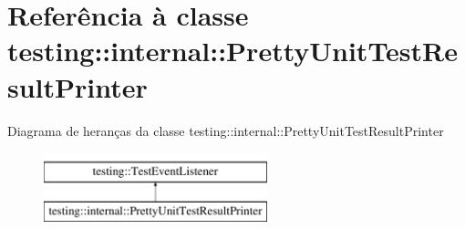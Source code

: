 \hypertarget{classtesting_1_1internal_1_1PrettyUnitTestResultPrinter}{\section{Referência à classe testing\-:\-:internal\-:\-:Pretty\-Unit\-Test\-Result\-Printer}
\label{classtesting_1_1internal_1_1PrettyUnitTestResultPrinter}
}
Diagrama de heranças da classe testing\-:\-:internal\-:\-:Pretty\-Unit\-Test\-Result\-Printer\begin{figure}[H]
\begin{center}
\leavevmode
\includegraphics[height=2.000000cm]{classtesting_1_1internal_1_1PrettyUnitTestResultPrinter}
\end{center}
\end{figure}
